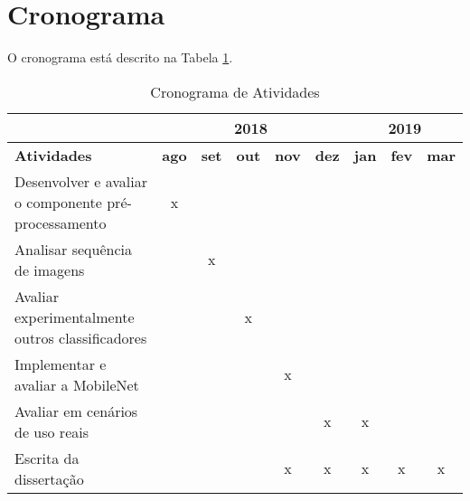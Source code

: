 
\section{Cronograma}\label{sec:cronograma}
O cronograma está descrito na Tabela \ref{table:cronog}.

\begin{table}[]\footnotesize
\caption{Cronograma de Atividades}
\label{table:cronog}
\begin{tabular}{l|ccccc|ccc|}
\cline{2-9}
                                                                           & \multicolumn{5}{c|}{\textbf{2018}}                                       & \multicolumn{3}{c|}{\textbf{2019}}         \\ \hline
\multicolumn{1}{|l|}{\textbf{Atividades}}                                  & \textbf{ago} & \textbf{set} & \textbf{out} & \textbf{nov} & \textbf{dez} & \textbf{jan} & \textbf{fev} & \textbf{mar} \\ \hline
\multicolumn{1}{|l|}{Desenvolver e avaliar o componente pré-processamento} & x            &              &              &              &              &              &              &              \\
\multicolumn{1}{|l|}{Analisar sequência de imagens}                        &              & x            &              &              &              &              &              &              \\
\multicolumn{1}{|l|}{Avaliar experimentalmente outros classificadores}     &              &              & x            &              &              &              &              &              \\
\multicolumn{1}{|l|}{Implementar e avaliar a MobileNet}                    &              &              &              & x            &              &              &              &              \\
\multicolumn{1}{|l|}{Avaliar em cenários de uso reais}                     &              &              &              &              & x            & x            &              &              \\
\multicolumn{1}{|l|}{Escrita da dissertação}                                  &              &              &              & x            & x            & x            & x            & x            \\ \hline
\end{tabular}
\end{table}


% 
